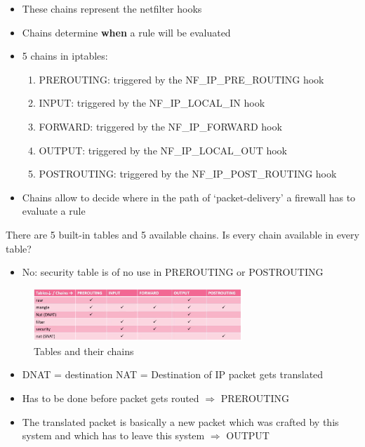 \documentclass{article}
\begin{document}
\begin{itemize}
    \item These chains represent the netfilter hooks
    \item Chains determine \textbf{when} a rule will be evaluated
    \item 5 chains in iptables:
    \begin{enumerate}
        \item PREROUTING: triggered by the NF\_IP\_PRE\_ROUTING hook
        \item INPUT: triggered by the NF\_IP\_LOCAL\_IN hook
        \item FORWARD: triggered by the NF\_IP\_FORWARD hook
        \item OUTPUT: triggered by the NF\_IP\_LOCAL\_OUT hook
        \item POSTROUTING: triggered by the NF\_IP\_POST\_ROUTING hook
    \end{enumerate}
    \item Chains allow to decide where in the path of `packet-delivery' a firewall has to evaluate a rule
\end{itemize}

There are 5 built-in tables and 5 available chains.
Is every chain available in every table?

\begin{itemize}
    \item No: security table is of no use in PREROUTING or POSTROUTING  
\end{itemize}

\begin{figure}[H]
    \centering
    \includegraphics[width=0.7\textwidth]{iptables-tables-and-chains.png}
    \caption{Tables and their chains}
\end{figure}

\begin{itemize}
    \item DNAT = destination NAT = Destination of IP packet gets translated
    \item Has to be done before packet gets routed $\Rightarrow$ PREROUTING
    \item The translated packet is basically a new packet which was crafted by this system and which has to leave this system $\Rightarrow$ OUTPUT
\end{itemize}
\end{document}
